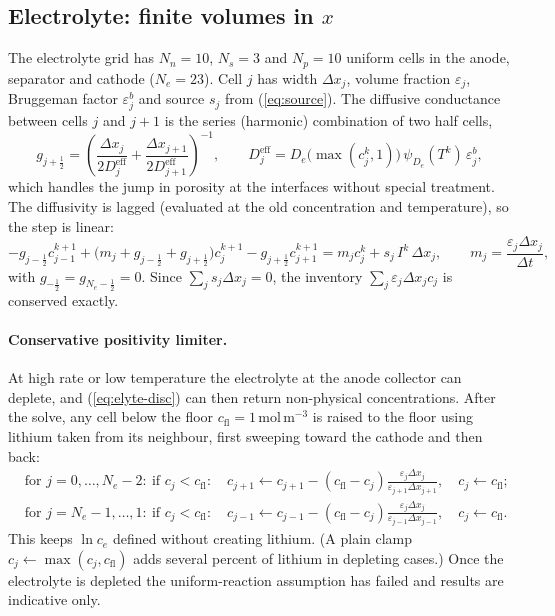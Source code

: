 \documentclass[11pt]{article}
\newcommand{\ce}{c_{e}}
\newcommand{\eps}{\varepsilon}
\newcommand{\unit}[1]{\,\mathrm{#1}}
\begin{document}
\subsection{Electrolyte: finite volumes in $x$}\label{sec:elyte-num}
The electrolyte grid has $N_n=10$, $N_s=3$ and $N_p=10$ uniform cells in the anode, separator and cathode ($N_e=23$). Cell $j$ has width $\Delta x_j$, volume fraction $\eps_j$, Bruggeman factor $\eps_j^{b}$ and source $s_j$ from (\ref{eq:source}). The diffusive conductance between cells $j$ and $j+1$ is the series (harmonic) combination of two half cells,
\begin{equation}
g_{j+\frac12}=\left(\frac{\Delta x_j}{2D_j^{\mathrm{eff}}}+\frac{\Delta x_{j+1}}{2D_{j+1}^{\mathrm{eff}}}\right)^{-1},\qquad
D_j^{\mathrm{eff}}=D_e\bigl(\max(c_j^{k},1)\bigr)\,\psi_{D_e}(T^{k})\,\eps_j^{b},
\end{equation}
which handles the jump in porosity at the interfaces without special treatment. The diffusivity is lagged (evaluated at the old concentration and temperature), so the step is linear:
\begin{equation}
-g_{j-\frac12}c_{j-1}^{k+1}+\bigl(m_j+g_{j-\frac12}+g_{j+\frac12}\bigr)c_j^{k+1}-g_{j+\frac12}c_{j+1}^{k+1}=m_jc_j^{k}+s_j\,I^{k}\,\Delta x_j,
\qquad m_j=\frac{\eps_j\Delta x_j}{\Delta t},\label{eq:elyte-disc}
\end{equation}
with $g_{-\frac12}=g_{N_e-\frac12}=0$. Since $\sum_j s_j\Delta x_j=0$, the inventory $\sum_j\eps_j\Delta x_jc_j$ is conserved exactly.

\paragraph{Conservative positivity limiter.} At high rate or low temperature the electrolyte at the anode collector can deplete, and (\ref{eq:elyte-disc}) can then return non-physical concentrations. After the solve, any cell below the floor $c_{\mathrm{fl}}=1\unit{mol\,m^{-3}}$ is raised to the floor using lithium taken from its neighbour, first sweeping toward the cathode and then back:
\begin{align}
&\text{for } j=0,\dots,N_e-2:\ \text{if } c_j<c_{\mathrm{fl}}:\quad c_{j+1}\leftarrow c_{j+1}-(c_{\mathrm{fl}}-c_j)\frac{\eps_j\Delta x_j}{\eps_{j+1}\Delta x_{j+1}},\quad c_j\leftarrow c_{\mathrm{fl}};\\
&\text{for } j=N_e-1,\dots,1:\ \text{if } c_j<c_{\mathrm{fl}}:\quad c_{j-1}\leftarrow c_{j-1}-(c_{\mathrm{fl}}-c_j)\frac{\eps_j\Delta x_j}{\eps_{j-1}\Delta x_{j-1}},\quad c_j\leftarrow c_{\mathrm{fl}}.
\end{align}
This keeps $\ln\ce$ defined without creating lithium. (A plain clamp $c_j\leftarrow\max(c_j,c_{\mathrm{fl}})$ adds several percent of lithium in depleting cases.) Once the electrolyte is depleted the uniform-reaction assumption has failed and results are indicative only.
\end{document}
